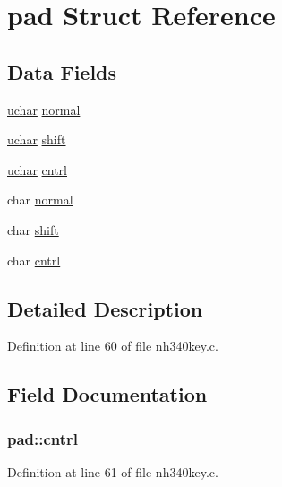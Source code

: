 \hypertarget{structpad}{\section{pad Struct Reference}
\label{structpad}
}
\subsection*{Data Fields}
\begin{DoxyCompactItemize}
\item 
\hyperlink{config_8h_a65f85814a8290f9797005d3b28e7e5fc}{uchar} \hyperlink{structpad_a4cd6384a403104717c1aec3768969e9a}{normal}
\item 
\hyperlink{config_8h_a65f85814a8290f9797005d3b28e7e5fc}{uchar} \hyperlink{structpad_a42a0cc78157ef5c948b92bbf379ab3d4}{shift}
\item 
\hyperlink{config_8h_a65f85814a8290f9797005d3b28e7e5fc}{uchar} \hyperlink{structpad_a5ebaedfe034b7f53a586260426085e14}{cntrl}
\item 
char \hyperlink{structpad_a5b5c28e408e3e882cd7796f2c0aff3dd}{normal}
\item 
char \hyperlink{structpad_a667d36e44c4a56c29a8c248bec5d0c76}{shift}
\item 
char \hyperlink{structpad_a40e6032da3145f7bcf936a79afeb8f43}{cntrl}
\end{DoxyCompactItemize}


\subsection{Detailed Description}


Definition at line 60 of file nh340key.\+c.



\subsection{Field Documentation}
\hypertarget{structpad_a5ebaedfe034b7f53a586260426085e14}{
\subsubsection[{cntrl}]{ pad\+::cntrl}}\label{structpad_a5ebaedfe034b7f53a586260426085e14}


Definition at line 61 of file nh340key.\+c.



